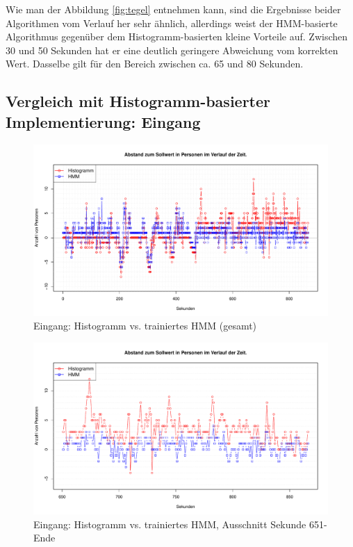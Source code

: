 Wie man der Abbildung \ref{fig:tegel} entnehmen kann, sind die Ergebnisse beider Algorithmen vom Verlauf her sehr ähnlich, allerdings weist der HMM-basierte Algorithmus gegenüber dem Histogramm-basierten kleine Vorteile auf.
Zwischen 30 und 50 Sekunden hat er eine deutlich geringere Abweichung vom korrekten Wert. Dasselbe gilt für den Bereich zwischen ca. 65 und 80 Sekunden.\\

\subsection{Vergleich mit Histogramm-basierter Implementierung: Eingang}
\label{sec:eval_eingang}

\begin{figure}
	\centering
	\includegraphics[width=1\textwidth]{bilder/eingang2_histo_vs_hmm_prelearned.pdf}
	\caption{Eingang: Histogramm vs. trainiertes HMM (gesamt)}
	\label{fig:Eingang-gesamt}
\end{figure}

\begin{figure}
	\centering
	\includegraphics[width=1\textwidth]{bilder/safest_plot_histo_vs_prelearned_652-end.pdf}
	\caption{Eingang: Histogramm vs. trainiertes HMM, Ausschnitt Sekunde 651-Ende}
	\label{fig:Eingang-teil}
\end{figure}

